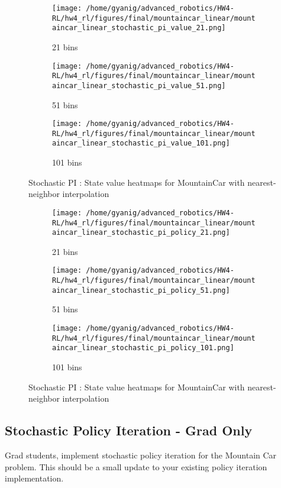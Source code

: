 \documentclass{article}
\begin{document}
\begin{figure}[h]
    \centering
    \begin{subfigure}{0.32\textwidth}
        \texttt{[image: /home/gyanig/advanced\_robotics/HW4-RL/hw4\_rl/figures/final/mountaincar\_linear/mountaincar\_linear\_stochastic\_pi\_value\_21.png]}
        \caption{21 bins}
    \end{subfigure}
    \begin{subfigure}{0.32\textwidth}
        \texttt{[image: /home/gyanig/advanced\_robotics/HW4-RL/hw4\_rl/figures/final/mountaincar\_linear/mountaincar\_linear\_stochastic\_pi\_value\_51.png]}
        \caption{51 bins}
    \end{subfigure}
    \begin{subfigure}{0.32\textwidth}
        \texttt{[image: /home/gyanig/advanced\_robotics/HW4-RL/hw4\_rl/figures/final/mountaincar\_linear/mountaincar\_linear\_stochastic\_pi\_value\_101.png]}
        \caption{101 bins}
    \end{subfigure}
    \caption{Stochastic PI : State value heatmaps for MountainCar with nearest-neighbor interpolation}
\end{figure}

\begin{figure}[h]
    \centering
    \begin{subfigure}{0.32\textwidth}
        \texttt{[image: /home/gyanig/advanced\_robotics/HW4-RL/hw4\_rl/figures/final/mountaincar\_linear/mountaincar\_linear\_stochastic\_pi\_policy\_21.png]}
        \caption{21 bins}
    \end{subfigure}
    \begin{subfigure}{0.32\textwidth}
        \texttt{[image: /home/gyanig/advanced\_robotics/HW4-RL/hw4\_rl/figures/final/mountaincar\_linear/mountaincar\_linear\_stochastic\_pi\_policy\_51.png]}
        \caption{51 bins}
    \end{subfigure}
    \begin{subfigure}{0.32\textwidth}
        \texttt{[image: /home/gyanig/advanced\_robotics/HW4-RL/hw4\_rl/figures/final/mountaincar\_linear/mountaincar\_linear\_stochastic\_pi\_policy\_101.png]}
        \caption{101 bins}
    \end{subfigure}
    \caption{Stochastic PI : State value heatmaps for MountainCar with nearest-neighbor interpolation}
\end{figure}
\newpage
\subsection{Stochastic Policy Iteration - Grad Only}
Grad students, implement stochastic policy iteration for the Mountain Car problem. This should be a small update to your existing policy iteration implementation.
\end{document}
